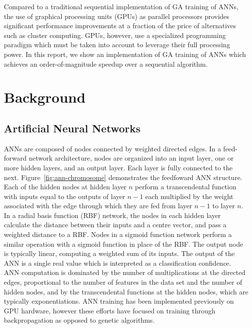 \documentclass[letterpaper]{jpconf}       %
\begin{document}
Compared to a traditional sequential implementation of GA training of ANNs, the use of graphical processing units (GPUs) as parallel processors provides significant performance improvements at a fraction of the price of alternatives such as cluster computing. GPUs, however, use a specialized programming paradigm which must be taken into account to leverage their full processing power. In this report, we show an implementation of GA training of ANNs which achieves an order-of-magnitude speedup over a sequential algorithm.

\section{Background} \label{background}

\subsection{Artificial Neural Networks} \label{ann}
ANNs are composed of nodes connected by weighted directed edges. In a feed-forward network architecture, nodes are organized into an input layer, one or more hidden layers, and an output layer. Each layer is fully connected to the next. Figure~\ref{fig:ann-chromosome} demonstrates the feedfoward ANN structure. Each of the hidden nodes at hidden layer $n$ perform a transcendental function with inputs equal to the outputs of layer $n-1$ each multiplied by the weight associated with the edge through which they are fed from layer $n-1$ to layer $n$. In a radial basis function (RBF) network, the nodes in each hidden layer calculate the distance between their inputs and a centre vector, and pass a weighted distance to a RBF. Nodes in a sigmoid function network perform a similar operation with a sigmoid function in place of the RBF. The output node is typically linear, computing a weighted sum of its inputs. The output of the ANN is a single real value which is interpreted as a classification confidence. ANN computation is dominated by the number of multiplications at the directed edges, proportional to the number of features in the data set and the number of hidden nodes, and by the transcendental functions at the hidden nodes, which are typically exponentiations.  ANN training has been implemented previously on GPU hardware, however these efforts have focused on training through backpropagation \cite{backprop} as opposed to genetic algorithms.
\end{document}
